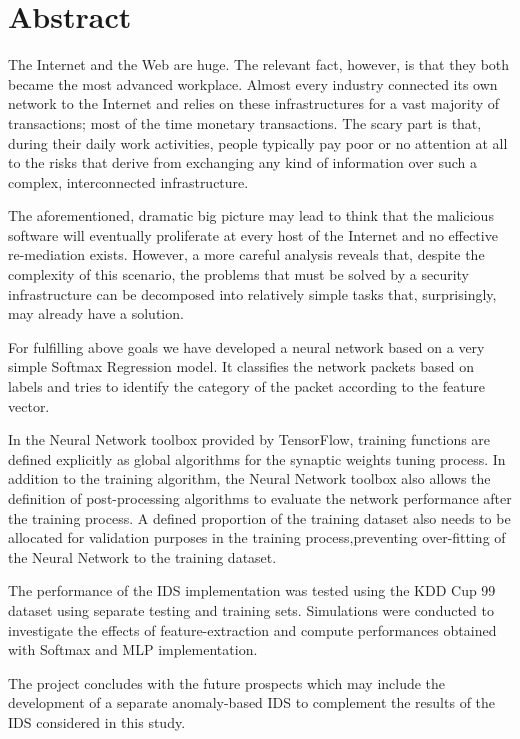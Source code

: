 \documentclass[12pt]{article}
\theoremstyle{definition}
\begin{document}
	\section*{\centering Abstract}
	
	The Internet and the Web are huge. The relevant fact, however, is that they both became the most advanced workplace. Almost every industry connected its own network to the Internet and relies on these infrastructures for a vast majority of transactions; most of the time monetary transactions. The scary part is that, during their daily work activities, people typically pay poor or no attention at all to the risks that derive from exchanging any kind of information over such a complex, interconnected infrastructure.
	
	The aforementioned, dramatic big picture may lead to think that the malicious software will eventually proliferate at every host of the Internet and no effective re-mediation exists. However, a more careful analysis reveals that, despite the complexity of this scenario, the problems that must be solved by a security infrastructure can be decomposed into relatively simple tasks that, surprisingly, may already have a solution.
	
	For fulfilling above goals we have developed a neural network based on a very simple Softmax Regression model. It classifies the network packets based on labels and tries to identify the category of the packet according to the feature vector.
	
	In the Neural Network toolbox provided by TensorFlow, training functions are defined explicitly as global algorithms for the synaptic weights tuning process. In addition to the training algorithm, the Neural Network toolbox also allows the definition of post-processing algorithms to evaluate the
	network performance after the training process. A defined proportion of the training dataset also needs to be allocated for validation purposes in the training process,preventing over-fitting of the Neural Network to the training dataset.
	
	The performance of the IDS implementation was tested using the KDD Cup 99 dataset using separate testing and training sets. Simulations were conducted to investigate the effects of feature-extraction and compute performances obtained with Softmax and MLP implementation.
	
	The project concludes with the future prospects which may include the development of a separate anomaly-based IDS to complement the results of the IDS considered in this study.
	\cleardoublepage
	
\end{document}
